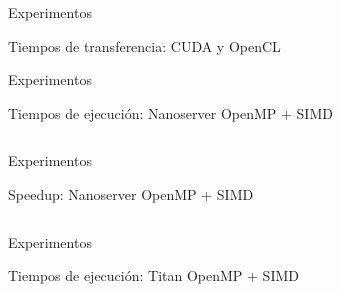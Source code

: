 \begin{frame}{Experimentos}
\begin{block}{Tiempos de transferencia: CUDA y OpenCL}
    \centerline{
      }
\end{block}
\end{frame}
\begin{frame}{Experimentos}
\begin{block}{Tiempos de ejecución: Nanoserver OpenMP + SIMD}

\begin{columns}
  \begin{column}{.50\textwidth}
	\centerline{
      }
  \end{column}
  \begin{column}{.50\textwidth}
    \centerline{
      }
  \end{column}
\end{columns}
\end{block}
\end{frame}

\begin{frame}{Experimentos}
\begin{block}{Speedup: Nanoserver OpenMP + SIMD}

\begin{columns}
  \begin{column}{.50\textwidth}
	\centerline{
      }

  \end{column}
  \begin{column}{.50\textwidth}
    \centerline{
      }
  \end{column}
  \end{columns}
\end{block}
\end{frame}
\begin{frame}{Experimentos}
\begin{block}{Tiempos de ejecución: Titan OpenMP + SIMD}

\begin{columns}
  \begin{column}{.50\textwidth}
	\centerline{
      }
  \end{column}
  \begin{column}{.50\textwidth}
    \centerline{
      }
  \end{column}
\end{columns}
\end{block}
\end{frame}

